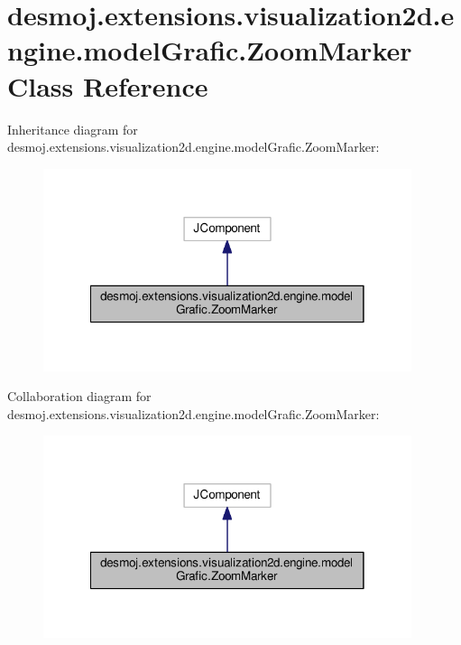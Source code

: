 \section{desmoj.\-extensions.\-visualization2d.\-engine.\-model\-Grafic.\-Zoom\-Marker Class Reference}
\label{classdesmoj_1_1extensions_1_1visualization2d_1_1engine_1_1model_grafic_1_1_zoom_marker}


Inheritance diagram for desmoj.\-extensions.\-visualization2d.\-engine.\-model\-Grafic.\-Zoom\-Marker\-:
\nopagebreak
\begin{figure}[H]
\begin{center}
\leavevmode
\includegraphics[width=306pt]{classdesmoj_1_1extensions_1_1visualization2d_1_1engine_1_1model_grafic_1_1_zoom_marker__inherit__graph}
\end{center}
\end{figure}


Collaboration diagram for desmoj.\-extensions.\-visualization2d.\-engine.\-model\-Grafic.\-Zoom\-Marker\-:
\nopagebreak
\begin{figure}[H]
\begin{center}
\leavevmode
\includegraphics[width=306pt]{classdesmoj_1_1extensions_1_1visualization2d_1_1engine_1_1model_grafic_1_1_zoom_marker__coll__graph}
\end{center}
\end{figure}
